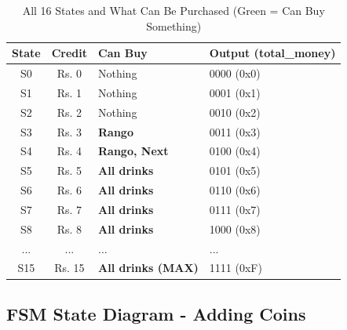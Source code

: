 \documentclass[12pt,a4paper]{article}
\begin{document}
\begin{table}[H]
    \centering
    \begin{tabular}{|c|c|l|l|}
        \hline
        \textbf{State} & \textbf{Credit} & \textbf{Can Buy} & \textbf{Output (total\_money)} \\
        \hline
        S0 & Rs. 0 & Nothing & 0000 (0x0) \\
        S1 & Rs. 1 & Nothing & 0001 (0x1) \\
        S2 & Rs. 2 & Nothing & 0010 (0x2) \\
        \rowcolor{green!20} S3 & Rs. 3 & \textbf{Rango} & 0011 (0x3) \\
        \rowcolor{green!20} S4 & Rs. 4 & \textbf{Rango, Next} & 0100 (0x4) \\
        \rowcolor{green!20} S5 & Rs. 5 & \textbf{All drinks} & 0101 (0x5) \\
        \rowcolor{green!20} S6 & Rs. 6 & \textbf{All drinks} & 0110 (0x6) \\
        \rowcolor{green!20} S7 & Rs. 7 & \textbf{All drinks} & 0111 (0x7) \\
        \rowcolor{green!20} S8 & Rs. 8 & \textbf{All drinks} & 1000 (0x8) \\
        ... & ... & ... & ... \\
        \rowcolor{green!20} S15 & Rs. 15 & \textbf{All drinks (MAX)} & 1111 (0xF) \\
        \hline
    \end{tabular}
    \caption{All 16 States and What Can Be Purchased (Green = Can Buy Something)}
\end{table}

\subsection{FSM State Diagram - Adding Coins}
\end{document}
